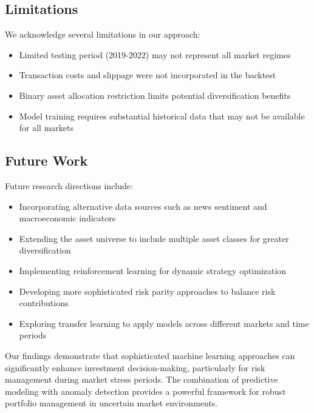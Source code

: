 \documentclass[10pt]{article}
\begin{document}
\subsection{Limitations}
We acknowledge several limitations in our approach:

\begin{itemize}
    \item Limited testing period (2019-2022) may not represent all market regimes
    \item Transaction costs and slippage were not incorporated in the backtest
    \item Binary asset allocation restriction limits potential diversification benefits
    \item Model training requires substantial historical data that may not be available for all markets
\end{itemize}

\subsection{Future Work}
Future research directions include:

\begin{itemize}
    \item Incorporating alternative data sources such as news sentiment and macroeconomic indicators
    \item Extending the asset universe to include multiple asset classes for greater diversification
    \item Implementing reinforcement learning for dynamic strategy optimization
    \item Developing more sophisticated risk parity approaches to balance risk contributions
    \item Exploring transfer learning to apply models across different markets and time periods
\end{itemize}

Our findings demonstrate that sophisticated machine learning approaches can significantly enhance investment decision-making, particularly for risk management during market stress periods. The combination of predictive modeling with anomaly detection provides a powerful framework for robust portfolio management in uncertain market environments.



\end{document}
